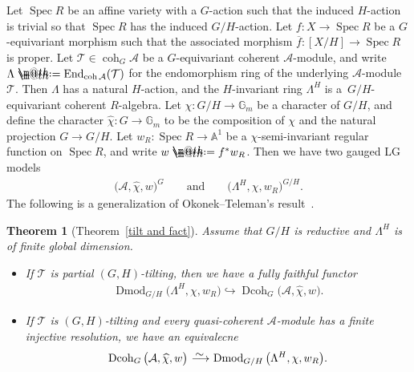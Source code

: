 \documentclass[pdftex]{sigma}%
\makeatletter
\newtheorem{thm}[dfn]{Theorem}
\newcommand*{\defeq}{\mathrel{\rlap{%
 \raisebox{0.3ex}{$\m@th\cdot$}}%
 \raisebox{-0.3ex}{$\m@th\cdot$}}%
 =}
\numberwithin{equation}{section}
\newcommand{\Dmod}{\operatorname{Dmod}}
\newcommand{\Dcoh}{\operatorname{Dcoh}}
\newcommand{\Spec}{\operatorname{Spec}}
\newcommand{\End}{\operatorname{End}}
\newcommand{\coh}{\operatorname{coh}}
\newcommand{\cA}{\mathcal{A}}
\newcommand{\cT}{\mathcal{T}}
\newcommand{\bA}{\mathbb{A}}
\newcommand{\bG}{\mathbb{G}}
\newcommand{\simto}{\,\,\,\,\raisebox{4pt}{$\sim$}{\kern -1.1em \longrightarrow}\,}
\newcommand{\hookto}{\hookrightarrow}
\makeatother
\begin{document}
Let $\Spec R$ be an affine variety with a $G$-action such that the induced $H$-action is trivial so that $\Spec R$ has the induced $G/H$-action.
Let $f\colon X\to \Spec R$ be a $G$-equivariant morphism such that the associated morphism $\overline{f}\colon[X/H]\to \Spec R$ is proper. Let $\cT\in \coh_G\cA$ be a $G$-equivariant coherent $\cA$-module, and write $\Lambda\defeq\End_{\coh\cA}(\cT)$ for the endomorphism ring of the underlying $\cA$-module $\cT$. Then $\Lambda$ has a natural $H$-action, and the $H$-invariant ring $\Lambda^H$ is a~$G/H$-equivariant coherent $R$-algebra.
Let $\chi\colon G/H\to \bG_m$ be a character of $G/H$, and define the character $\widehat{\chi}\colon G\to \bG_m$ to be the composition of $\chi$ and the natural projection $G\to G/H$. Let $w_R\colon \Spec R\to \bA^1$ be a $\chi$-semi-invariant regular function on $\Spec R$, and write $w\defeq f^*w_R$. Then we have two gauged LG models
\begin{gather*}
\big(\cA,\widehat{\chi},w\big)^G \qquad\text{and}\qquad \big(\Lambda^H,\chi,w_R\big)^{G/H}.
\end{gather*}
The following is a generalization of Okonek--Teleman's result~\cite[Theorem~1.11]{ot}.
\begin{thm}[Theorem~\ref{tilt and fact}]\label{main intro}
Assume that $G/H$ is reductive and $\Lambda^H$ is of finite global dimension.
\begin{itemize}\itemsep=0pt
\item[$1.$] If $\cT$ is partial $(G,H)$-tilting, then we have a fully faithful functor
\begin{gather*}
\Dmod_{G/H}\big(\Lambda^H,\chi,w_R\big)\hookto\Dcoh_{G}\big(\cA,\widehat{\chi},w\big).
\end{gather*}
\item[$2.$] If $\cT$ is $(G,H)$-tilting and every quasi-coherent $\cA$-module has a finite injective resolution, we have an equivalecne
\begin{gather*}
\Dcoh_{G}\big(\cA,\widehat{\chi},w\big)\simto\Dmod_{G/H}\big(\Lambda^H,\chi,w_R\big).
\end{gather*}
\end{itemize}
\end{thm}
\end{document}
